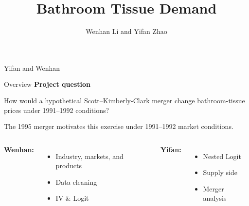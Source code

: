 \documentclass[aspectratio=169,11pt]{beamer}
\title{Bathroom Tissue Demand}
\author{Wenhan Li and Yifan Zhao}
\newcommand{\KC}{Kimberly-Clark}
\begin{document}
\begin{frame}
\vspace{12mm}{\LARGE\bfseries What would a Scott--\KC\ merger\\[2mm]do to bathroom tissue prices?}\par
\vspace{8mm}{\large Dominick's scanner data, 1991--1992}\par
\vspace{9mm}Yifan and Wenhan
\end{frame}
\begin{frame}{Overview}
\textbf{Project question}\par\vspace{2mm}
How would a hypothetical Scott--Kimberly-Clark merger change bathroom-tissue prices under 1991--1992 conditions?

\vspace{5mm}
The 1995 merger motivates this exercise under 1991--1992 market conditions.\par\medskip

\vspace{5mm}


\begin{columns}[T,onlytextwidth]
\textbf{Wenhan:}
\begin{itemize}\setlength\itemsep{2mm}
\item Industry, markets, and products
\item Data cleaning
\item IV \& Logit
\end{itemize}
\textbf{Yifan:}
\begin{itemize}\setlength\itemsep{2mm}
\item Nested Logit
\item Supply side
\item Merger analysis
\end{itemize}
\end{columns}
\end{frame}
\end{document}
